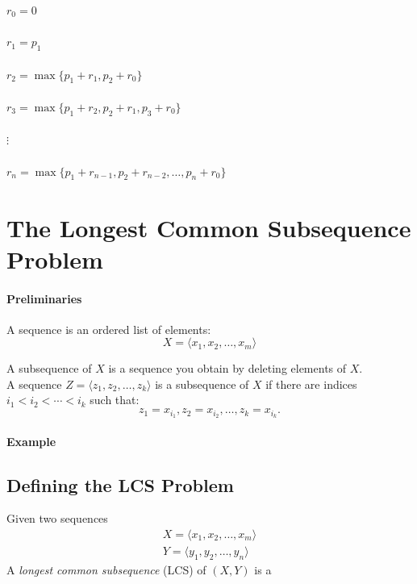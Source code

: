 \documentclass[11  pt]{article}
\begin{document}
\vs{1cm}
{\Large
$r_0 = 0$ \\ \\
$r_1 = p_1 $\\\\
$r_2 = \max \{ p_1 + r_1, p_2 + r_0\} $\\\\
$r_3 = \max \{ p_1 + r_2, p_2 + r_1, p_3 + r_0\}$ \\\\
$\vdots $\\\\
$r_n = \max \{ p_1 + r_{n-1}, p_2 + r_{n-2}, \hdots , p_n + r_0\} $\\
}%




\newpage

\section{The Longest Common Subsequence Problem}

\paragraph{Preliminaries} A sequence is an ordered list of elements:\\
\begin{equation*}
	X = \langle x_1, x_2, \hdots ,x_m \rangle
\end{equation*}

A subsequence of $X$ is a sequence you obtain by deleting elements of $X$. \\

A sequence $Z = \langle z_1, z_2, \hdots , z_k \rangle$ is a subsequence of $X$ if there are indices $i_1 < i_2 < \cdots < i_k$ such that:
\begin{equation*}
	z_1 = x_{i_1}, z_2 = x_{i_2}, \hdots, z_k = x_{i_k}.
\end{equation*}

\paragraph{Example}


\newpage

\subsection{Defining the LCS Problem}
Given two sequences 
\begin{align*}
	X = \langle x_1, x_2, \hdots ,x_m \rangle \\
	Y = \langle y_1, y_2, \hdots ,y_n \rangle
\end{align*}
A \emph{longest common subsequence} (LCS) of $(X,Y)$ is a \\
\end{document}
